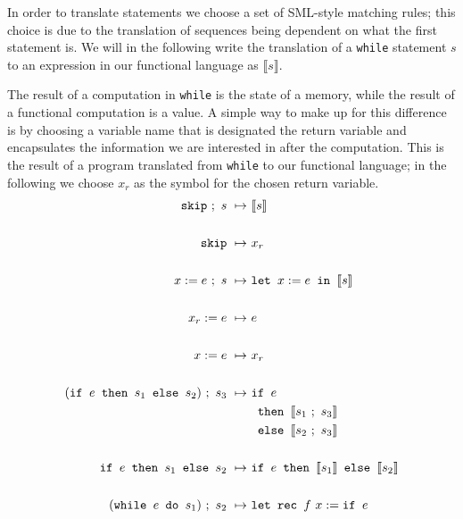 \documentclass[11pt, leqno, titlepage]{article}
\theoremstyle{definition}
\begin{document}
In order to translate statements we choose a set of SML-style matching rules; this
choice is due to the translation of sequences being dependent on what the first
statement is. We will in the following write the translation of a \texttt{while}
statement $s$ to an expression in our functional language as $\llbracket s
\rrbracket$. 

The result of a computation in \texttt{while} is the state of a memory, while the
result of a functional computation is a value. A simple way to make up for this
difference is by choosing a variable name that is designated the return variable and
encapsulates the information we are interested in after the computation. This is the
result of a program translated from \texttt{while} to our functional language; in the
following we choose $x_r$ as the symbol for the chosen return variable. 
\begin{align}
  \label{eq:transwhile}
  \texttt{skip}~;~s ~\mapsto~ & \llbracket s \rrbracket\\
  \notag\\
  \texttt{skip}     ~\mapsto~ & x_r\\
  \notag\\
  x := e~;~s        ~\mapsto~ & \texttt{let } x := e \texttt{ in }\llbracket s \rrbracket\\
  \notag\\
  x_r := e          ~\mapsto~ & e \\
  \notag\\
  x := e            ~\mapsto~ & x_r \\
  \notag\\
  (\texttt{if } e \texttt{ then } s_1 \texttt{ else } s_2) ~;~s_3
                    ~\mapsto~ & \texttt{if } e \\
                    &  \texttt{ then } \llbracket s_1 ~;~ s_3 \rrbracket\notag\\
                    & \texttt{ else } \llbracket s_2 ~;~ s_3 \rrbracket \notag\\
  \notag\\
  \texttt{if } e \texttt{ then } s_1 \texttt{ else } s_2
                    ~\mapsto~ & \texttt{if } e
                                  \texttt{ then } \llbracket s_1 \rrbracket
                                  \texttt{ else } \llbracket s_2 \rrbracket \\
  \notag\\
  (\texttt{while } e \texttt{ do } s_1) ~;~ s_2
                    ~\mapsto~ & \texttt{let rec } f~x :=
                                  \texttt{if } e \label{eq:while1}\\

\end{align}
\end{document}

